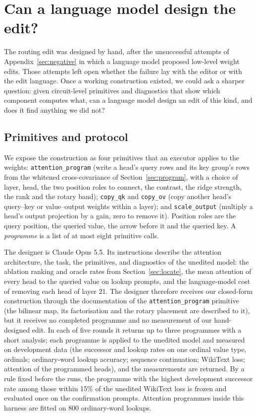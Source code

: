 \documentclass[11pt]{article}
\begin{document}
\section{Can a language model design the edit?}\label{sec:opus}

The routing edit was designed by hand, after the unsuccessful attempts of Appendix~\ref{sec:negative} in which a language model proposed low-level weight edits. Those attempts left open whether the failure lay with the editor or with the edit language. Once a working construction existed, we could ask a sharper question: given circuit-level primitives and diagnostics that show which component computes what, can a language model design an edit of this kind, and does it find anything we did not?

\subsection{Primitives and protocol}\label{sec:prims}

{\sloppy We expose the construction as four primitives that an executor applies to the weights: \texttt{attention\_program} (write a head's query rows and its key group's rows from the whitened cross-covariance of Section~\ref{sec:program}, with a choice of layer, head, the two position roles to connect, the contrast, the ridge strength, the rank and the rotary band); \texttt{copy\_qk} and \texttt{copy\_ov} (copy another head's query--key or value--output weights within a layer); and \texttt{scale\_output} (multiply a head's output projection by a gain, zero to remove it). Position roles are the query position, the queried value, the arrow before it and the queried key. A \emph{programme} is a list of at most eight primitive calls.\par}

The designer is Claude Opus 5.5. Its instructions describe the attention architecture, the task, the primitives, and diagnostics of the unedited model: the ablation ranking and oracle rates from Section~\ref{sec:locate}, the mean attention of every head to the queried value on lookup prompts, and the language-model cost of removing each head of layer 21. The designer therefore receives our closed-form construction through the documentation of the \texttt{attention\_program} primitive (the bilinear map, its factorisation and the rotary placement are described to it), but it receives no completed programme and no measurement of our hand-designed edit. In each of five rounds it returns up to three programmes with a short analysis; each programme is applied to the unedited model and measured on development data (the successor and lookup rates on one ordinal value type, ordinals; ordinary-word lookup accuracy; sequence continuation; WikiText loss; attention of the programmed heads), and the measurements are returned. By a rule fixed before the runs, the programme with the highest development successor rate among those within 15\% of the unedited WikiText loss is frozen and evaluated once on the confirmation prompts. Attention programmes inside this harness are fitted on 800 ordinary-word lookups.
\end{document}
